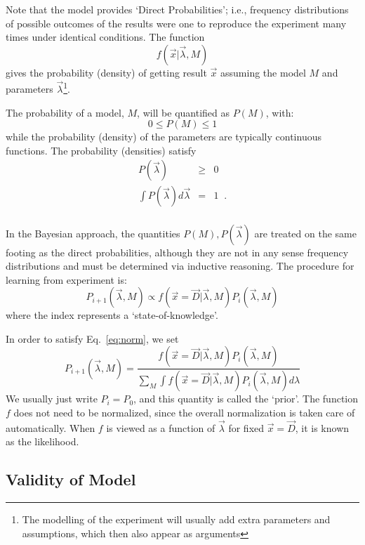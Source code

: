 \documentclass[11pt, a4paper]{article}
\begin{document}
Note that the model provides `Direct Probabilities'; i.e., frequency
distributions of possible outcomes of the results were one to
reproduce the experiment many times under identical conditions.  The
function
%
\begin{equation}
f(\vec{x}|\vec{\lambda},M)
\end{equation}
%
gives the probability (density) of getting result $\vec{x}$ assuming
the model $M$ and parameters $\vec{\lambda}$\footnote{The modelling of
the experiment will usually add extra parameters and assumptions,
which then also appear as arguments}.

The probability of a model, $M$, will be quantified as $P(M)$, with:
%
\begin{equation}
\label{eq:norm}
0 \leq P(M) \leq 1
\end{equation}
%
while the probability (density) of the parameters are typically
continuous functions.  The probability (densities) satisfy
%
\begin{eqnarray*}
P(\vec{\lambda}) & \ge & 0 \\
\int P(\vec{\lambda}) d\vec{\lambda} &=&1 \;\; .\\
\end{eqnarray*}

In the Bayesian approach, the quantities $P(M), P(\vec{\lambda})$ are
treated on the same footing as the direct probabilities, although they
are not in any sense frequency distributions and must be determined
via inductive reasoning.  The procedure for learning from experiment
is:
%
\begin{equation}
P_{i+1}(\vec{\lambda},M) \propto f(\vec{x}=\vec{D}|\vec{\lambda},M) P_{i}(\vec{\lambda},M) 
\end{equation}
%
where the index represents a `state-of-knowledge'.  

In order to satisfy Eq.~\ref{eq:norm}, we set
%
\begin{equation}
P_{i+1}(\vec{\lambda},M) =\frac{f(\vec{x}=\vec{D}|\vec{\lambda},M) P_{i}(\vec{\lambda},M)}
{\sum_M \int f(\vec{x}=\vec{D}|\vec{\lambda},M) P_{i}(\vec{\lambda},M) d{\lambda}}
\end{equation}
%
We usually just write $P_i=P_0$, and this quantity is called the
`prior'.  The function $f$ does not need to be normalized, since the
overall normalization is taken care of automatically.  When $f$ is
viewed as a function of $\vec{\lambda}$ for fixed $\vec{x}=\vec{D}$,
it is known as the likelihood.

\subsection{Validity of Model}
\end{document}
